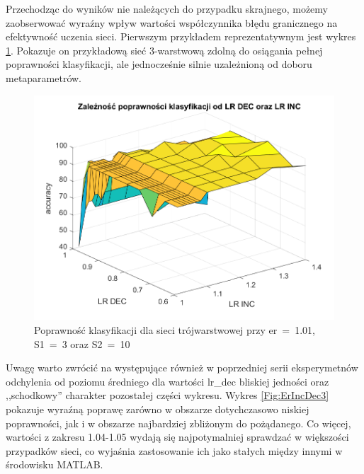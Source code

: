\documentclass[12pt,twoside]{article}
\begin{document}
Przechodząc do wyników nie należących do przypadku skrajnego, możemy zaobserwować wyraźny wpływ wartości współczynnika błędu granicznego na efektywność uczenia sieci.
Pierwszym przykładem reprezentatywnym jest wykres \ref{Fig:ErIncDec2}.
Pokazuje on przykładową sieć 3-warstwową zdolną do osiągania pełnej poprawności klasyfikacji, ale jednocześnie silnie uzależnioną od doboru metaparametrów.


\begin{figure}[ht]
	\centering
	\includegraphics[width=16cm]{figures/ErIncDec_2.png}
	\caption{Poprawność klasyfikacji dla sieci trójwarstwowej przy er~=~1.01, S1~=~3 oraz S2~=~10}
	\label{Fig:ErIncDec2}
\end{figure}

Uwagę warto zwrócić na  występujące również w poprzedniej serii eksperymetnów odchylenia od poziomu średniego dla wartości lr\_dec bliskiej jedności oraz ,,schodkowy'' charakter pozostałej części wykresu.
Wykres \ref{Fig:ErIncDec3} pokazuje wyraźną poprawę zarówno w obszarze dotychczasowo niskiej poprawności, jak i w obszarze najbardziej zbliżonym do pożądanego.
Co więcej, wartości z zakresu 1.04-1.05 wydają się najpotymalniej sprawdzać w większości przypadków sieci, co wyjaśnia zastosowanie ich jako stałych między innymi w środowisku MATLAB.
\end{document}
